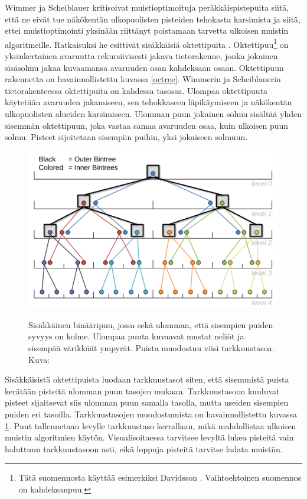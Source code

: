 Wimmer ja Scheiblauer kritisoivat muistioptimoituja peräkkäispistepuita siitä, että ne eivät tue näkökentän ulkopuolisten pisteiden tehokasta karsimista ja siitä, ettei muistioptimointi yksinään riittänyt poistamaan tarvetta ulkoisen muistin algoritmeille. Ratkaisuksi he esittivät sisäkkäisiä oktettipuita . Oktettipuu\footnote{Tätä suomennosta käyttää esimerkiksi Davidsson \cite{oktettipuu}. Vaihtoehtoinen suomennos on kahdeksanpuu.} on yksinkertainen avaruutta rekursiivisesti jakava tietorakenne, jonka jokainen sisäsolmu jakaa kuvaamansa avaruuden osan kahdeksaan osaan. Oktettipuun rakennetta on havainnollistettu kuvassa \ref{octree}. Wimmerin ja Scheiblauerin tietorakenteessa oktettipuita on kahdessa tasossa. Ulompaa oktettipuuta käytetään avaruuden jakamiseen, sen tehokkaseen läpikäymiseen ja näkökentän ulkopuolisten alueiden karsimiseen. Ulomman puun jokainen solmu sisältää yhden sisemmän oktettipuun, joka vastaa samaa avaruuden osaa, kuin ulkoisen puun solmu. Pisteet sijoitetaan sisempiin puihin, yksi jokaiseen solmuun. \cite{ip}

\begin{figure}
    \centering
    \includegraphics[width=0.6\paperwidth]{img/nested.png}
    \label{nested}
    \caption{Sisäkkäinen binääripuu, jossa sekä ulomman, että sisempien puiden syvyys on kolme. Ulompaa puuta kuvaavat mustat neliöt ja sisempää värikkäät ympyrät. Puista muodostuu viisi tarkkuustasoa. Kuva: \cite{scheiblauer}}
\end{figure}

Sisäkkäisistä oktettipuista luodaan tarkkuustasot siten, että sisemmistä puista kerätään pisteitä ulomman puun tasojen mukaan. Tarkkuustasoon kuuluvat pisteet sijaitsevat siis ulomman puun samalla tasolla, mutta useiden sisempien puiden eri tasoilla. Tarkkuustasojen muodostumista on havainnollistettu kuvassa \ref{nested}. Puut tallennetaan levylle tarkkuustaso kerrallaan, mikä mahdollistaa ulkoisen muistin algoritmien käytön. Visualisoitaessa tarvitsee levyltä lukea pisteitä vain haluttuun tarkkuustasoon asti, eikä loppuja pisteitä tarvitse ladata muistiin. \cite{ip}


